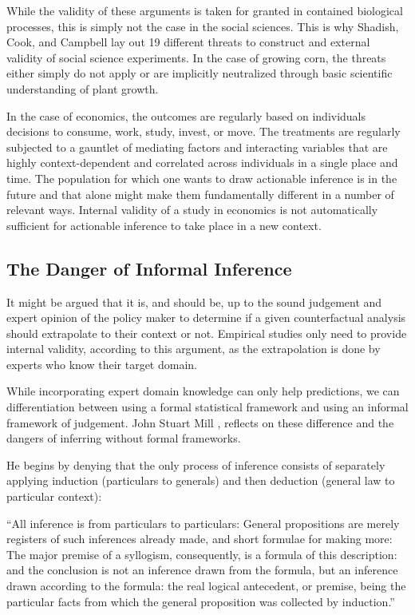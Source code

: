 \documentclass[a4paper,12pt]{article}
\begin{document}
While the validity of these arguments is taken for granted in contained biological processes, this is simply not the case in the social sciences. This is why Shadish, Cook, and Campbell lay out 19 different threats to construct and external validity of social science experiments. In the case of growing corn, the threats either simply do not apply or are implicitly neutralized through basic scientific understanding of plant growth.

In the case of economics, the outcomes are regularly based on individuals decisions to consume, work, study, invest, or move. The treatments are regularly subjected to a gauntlet of mediating factors and interacting variables that are highly context-dependent and correlated across individuals in a single place and time. The population for which one wants to draw actionable inference is in the future and that alone might make them fundamentally different in a number of relevant ways. Internal validity of a study in economics is not automatically sufficient for actionable inference to take place in a new context.

\subsection{The Danger of Informal Inference}

It might be argued that it is, and should be, up to the sound judgement and expert opinion of the policy maker to determine if a given counterfactual analysis should extrapolate to their context or not. Empirical studies only need to provide internal validity, according to this argument, as the extrapolation is done by experts who know their target domain.

While incorporating expert domain knowledge can only help predictions, we can differentiation between using a formal statistical framework and using an informal framework of judgement. John Stuart Mill \parencite*{mill1884}, reflects on these difference and the dangers of inferring without formal frameworks.

He begins by denying that the only process of inference consists of separately applying induction (particulars to generals) and then deduction (general law to particular context):

\begin{displayquote}
  ``All inference is from particulars to particulars: General propositions are merely registers of such inferences already made, and short formulae for making more: The major premise of a syllogism, consequently, is a formula of this description: and the conclusion is not an inference drawn from the formula, but an inference drawn according to the formula: the real logical antecedent, or premise, being the particular facts from which the general proposition was collected by induction.''  \parencite{mill1884}
\end{displayquote}
\end{document}

